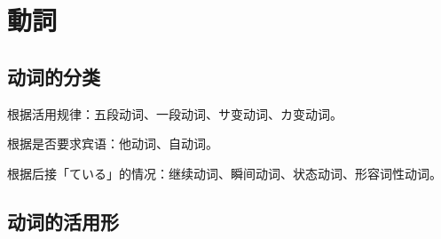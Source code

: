 \section{動詞}%


\subsection{动词的分类}%

\noindent 根据活用规律：五段动词、一段动词、サ变动词、カ变动词。

\noindent 根据是否要求宾语：他动词、自动词。

\noindent 根据后接「ている」的情况：继续动词、瞬间动词、状态动词、形容词性动词。


\subsection{动词的活用形}%

